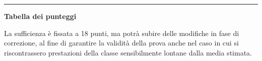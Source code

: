 \documentclass[11pt, a4paper]{exam}
\begin{document}
\begin{questions}

\addpoints
\question
{}

\end{questions}


\begin{center}
\rule[2ex]{\textwidth}{1pt}
\vspace{.5cm}
{\bf Tabella dei punteggi}
\vspace{10pt}

\combinedgradetable[h][questions]
\end{center}
\vspace{4pt}
\footnotesize La sufficienza è fissata a 18 punti, ma potrà subire delle modifiche in fase di correzione, al fine di garantire la validità della prova anche nel caso in cui si riscontrassero prestazioni della classe sensibilmente lontane dalla media stimata.
\end{document}
